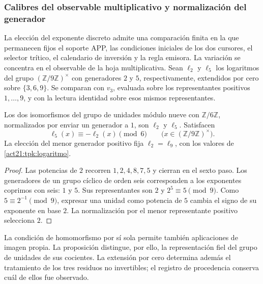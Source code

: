 \subsubsection{Calibres del observable multiplicativo y normalización del generador}
\label{mg05:calibres}

La elección del exponente discreto admite una comparación finita en la
que permanecen fijos el soporte APP, las condiciones iniciales de los
dos cursores, el selector trítico, el calendario de inversión y la regla
emisora. La variación se concentra en el observable de la hoja
multiplicativa. Sean \(\ell_{2}\) y \(\ell_{5}\) los logaritmos del
grupo \((\mathbb Z/9\mathbb Z)^\times\) con generadores \(2\) y
\(5\), respectivamente, extendidos por cero sobre \(\{3,6,9\}\).
Se comparan con \(v_3\), evaluada sobre los representantes positivos
\(1,\ldots,9\), y con la lectura identidad sobre esos mismos
representantes.

\begin{proposition}
\label{mg05:normalizacion}
Los dos isomorfismos del grupo de unidades módulo nueve con
\(\mathbb Z/6\mathbb Z\), normalizados por enviar un generador a
\(1\), son \(\ell_2\) y \(\ell_5\). Satisfacen
\[
 \ell_5(x)\equiv-\ell_2(x)\pmod6
 \qquad\bigl(x\in(\mathbb Z/9\mathbb Z)^\times\bigr).
\]
La elección del menor generador positivo fija \(\ell_2=\ell_9\),
con los valores de \eqref{act21:tpk:logaritmo}.
\end{proposition}
\begin{proof}
Las potencias de \(2\) recorren \(1,2,4,8,7,5\) y cierran en el
sexto paso. Los generadores de un grupo cíclico de orden seis
corresponden a los exponentes coprimos con seis: \(1\) y \(5\).
Sus representantes son \(2\) y \(2^5\equiv5\pmod9\).
Como \(5\equiv2^{-1}\pmod9\), expresar una unidad como potencia de
\(5\) cambia el signo de su exponente en base \(2\). La
normalización por el menor representante positivo selecciona \(2\).
\end{proof}

La condición de homomorfismo por sí sola permite también aplicaciones
de imagen propia. La proposición distingue, por ello, la representación
fiel del grupo de unidades de sus cocientes. La extensión por cero
determina además el tratamiento de los tres residuos no invertibles;
el registro de procedencia conserva cuál de ellos fue observado.

